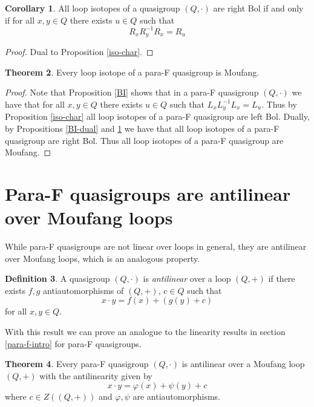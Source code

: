 \documentclass[12pt, twoside, openright]{report}
\theoremstyle{definition}
\newtheorem{thm}{Theorem}[chapter]
\newtheorem{cor}[thm]{Corollary}
\newtheorem{dfn}[thm]{Definition}
\begin{document}
\begin{cor}\label{iso-char-dual}
  All loop isotopes of a quasigroup $(Q, \cdot)$ are right Bol if and only if for all $x, y\in Q$ there exists $u\in Q$ such that
  \[R_x R_y^{-1} R_x = R_u\]
\end{cor}

\begin{proof}
  Dual to Proposition \ref{iso-char}.
\end{proof}

\begin{thm}\label{thm-iso-moufang}
  Every loop isotope of a para-F quasigroup is Moufang.
\end{thm}

\begin{proof}
  Note that Proposition \ref{BI} shows that in a para-F quasigroup $(Q, \cdot)$ we have that for all
    $x, y\in Q$ there exists $u\in Q$ such that $L_x L_y^{-1} L_x = L_u$. Thus by Proposition
    \ref{iso-char} all loop isotopes of a para-F quasigroup are left Bol. Dually, by Propositions
    \ref{BI-dual} and \ref{iso-char-dual} we have that all loop isotopes of a para-F quasigroup are
    right Bol. Thus all loop isotopes of a para-F quasigroup are Moufang. 
\end{proof}

\section{Para-F quasigroups are antilinear over Moufang loops}

While para-F quasigroups are not linear over loops in general, they are antilinear over Moufang loops,
  which is an analogous property.

\begin{dfn}
  A quasigroup $(Q, \cdot)$ is \emph{antilinear} over a loop $(Q, +)$ if there exists $f, g$
    antiautomorphisms of $(Q, +)$, $c\in Q$ such that
  \[x\cdot y = f(x) + (g(y) + c)\]
  for all $x, y\in Q$.
\end{dfn}

With this result we can prove an analogue to the linearity results in section \ref{para-f-intro}
  for para-F quasigroups.

\begin{thm}\label{thm-para-f}
  Every para-F quasigroup $(Q, \cdot)$ is antilinear over a Moufang loop $(Q, +)$ with the antilinearity
    given by
  \[x\cdot y = \varphi(x) + \psi(y) + c\] 
  where $c\in Z((Q, +))$ and $\varphi, \psi$ are antiautomorphisms.
\end{thm}
\end{document}
